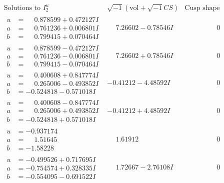\documentclass[1p]{elsarticle_modified}
\theoremstyle{definition}
\newcommand{\I}{\sqrt{-1}}
\begin{document}
$$\begin{array}{c|c|c}  
\text{Solutions to }I^u_{2}& \I (\text{vol} + \sqrt{-1}CS) & \text{Cusp shape}\\
 \hline 
\begin{aligned}
u &= \phantom{-}0.878599 + 0.472127 I \\
a &= \phantom{-}0.761236 + 0.006801 I \\
b &= \phantom{-}0.799415 + 0.070464 I\end{aligned}
 & \phantom{-}7.26602 - 0.78546 I & \phantom{-0.000000 } 0 \\ \hline\begin{aligned}
u &= \phantom{-}0.878599 - 0.472127 I \\
a &= \phantom{-}0.761236 - 0.006801 I \\
b &= \phantom{-}0.799415 - 0.070464 I\end{aligned}
 & \phantom{-}7.26602 + 0.78546 I & \phantom{-0.000000 } 0 \\ \hline\begin{aligned}
u &= \phantom{-}0.400608 + 0.847774 I \\
a &= \phantom{-}0.265006 - 0.493852 I \\
b &= -0.524818 - 0.571018 I\end{aligned}
 & -0.41212 - 4.48592 I & \phantom{-0.000000 } 0 \\ \hline\begin{aligned}
u &= \phantom{-}0.400608 - 0.847774 I \\
a &= \phantom{-}0.265006 + 0.493852 I \\
b &= -0.524818 + 0.571018 I\end{aligned}
 & -0.41212 + 4.48592 I & \phantom{-0.000000 } 0 \\ \hline\begin{aligned}
u &= -0.937174\phantom{ +0.000000I} \\
a &= \phantom{-}1.51645\phantom{ +0.000000I} \\
b &= -1.58228\phantom{ +0.000000I}\end{aligned}
 & \phantom{-}1.61912\phantom{ +0.000000I} & \phantom{-0.000000 } 0 \\ \hline\begin{aligned}
u &= -0.499526 + 0.717695 I \\
a &= -0.754574 + 0.328335 I \\
b &= -0.554095 - 0.691522 I\end{aligned}
 & \phantom{-}1.72667 - 2.76108 I & \phantom{-0.000000 } 0 \\ \hline\begin{aligned}

\end{aligned}
\end{array}$$
\end{document}

